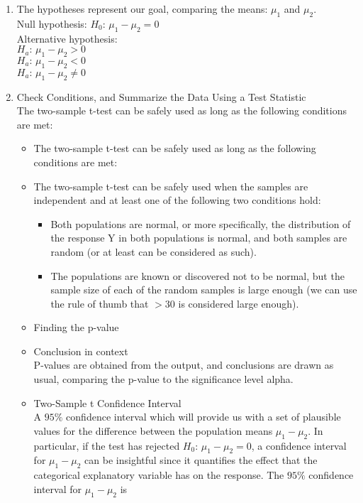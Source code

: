 \documentclass[10pt, a4paper]{article}
\begin{document}
\begin{enumerate}
\item The hypotheses represent our goal, comparing the means: $\mu_1$ and $\mu_2$. \\
Null hypothesis: $H_0: \, \mu_1 - \mu_2 = 0 $\\
Alternative hypothesis: \\
$H_a: \, \mu_1 - \mu_2 > 0 $\\
$H_a: \, \mu_1 - \mu_2 < 0 $\\
$H_a: \, \mu_1 - \mu_2 \neq 0 $\\
\item Check Conditions, and Summarize the Data Using a Test Statistic\\
The two-sample t-test can be safely used as long as the following conditions are met:
\begin{itemize}
\item  The two-sample t-test can be safely used as long as the following conditions are met:
\item The two-sample t-test can be safely used when the samples are independent and at least one of the following two conditions hold:  
\begin{itemize}
\item Both populations are normal, or more specifically, the distribution of the response Y in both populations is normal, and both samples are random (or at least can be considered as such).  
\item The populations are known or discovered not to be normal, but the sample size of each of the random samples is large enough (we can use the rule of thumb that $> 30$ is considered large enough).
\end{itemize}
\item Finding the p-value
\item Conclusion in context\\
P-values are obtained from the output, and conclusions are drawn as usual, comparing the p-value to the significance level alpha.
\item Two-Sample t Confidence Interval\\
A $95\%$ confidence interval which will provide us with a set of plausible values for the difference between the population means $\mu_1-\mu_2$. In particular, if the test has rejected $H_0: \, \mu_1 - \mu_2 = 0$, a confidence interval for $\mu_1-\mu_2$ can be insightful since it quantifies the effect that the categorical explanatory variable has on the response. The $95\%$ confidence interval for $\mu_1-\mu_2$ is 

\end{itemize}
\end{enumerate}
\end{document}
